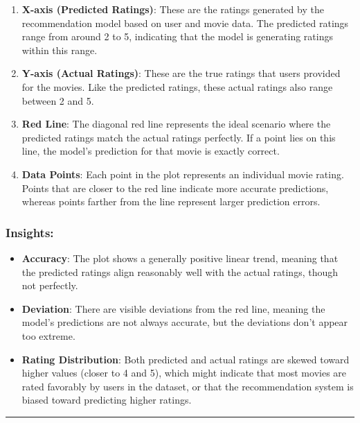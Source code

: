 \documentclass[
]{article}
\begin{document}
\begin{enumerate}
\def\labelenumi{\arabic{enumi}.}
\item
  \textbf{X-axis (Predicted Ratings)}: These are the ratings generated
  by the recommendation model based on user and movie data. The
  predicted ratings range from around 2 to 5, indicating that the model
  is generating ratings within this range.
\item
  \textbf{Y-axis (Actual Ratings)}: These are the true ratings that
  users provided for the movies. Like the predicted ratings, these
  actual ratings also range between 2 and 5.
\item
  \textbf{Red Line}: The diagonal red line represents the ideal scenario
  where the predicted ratings match the actual ratings perfectly. If a
  point lies on this line, the model's prediction for that movie is
  exactly correct.
\item
  \textbf{Data Points}: Each point in the plot represents an individual
  movie rating. Points that are closer to the red line indicate more
  accurate predictions, whereas points farther from the line represent
  larger prediction errors.
\end{enumerate}

\subsubsection{Insights:}\label{insights}

\begin{itemize}
\item
  \textbf{Accuracy}: The plot shows a generally positive linear trend,
  meaning that the predicted ratings align reasonably well with the
  actual ratings, though not perfectly.
\item
  \textbf{Deviation}: There are visible deviations from the red line,
  meaning the model's predictions are not always accurate, but the
  deviations don't appear too extreme.
\item
  \textbf{Rating Distribution}: Both predicted and actual ratings are
  skewed toward higher values (closer to 4 and 5), which might indicate
  that most movies are rated favorably by users in the dataset, or that
  the recommendation system is biased toward predicting higher ratings.
\end{itemize}

\begin{center}\rule{0.5\linewidth}{0.5pt}\end{center}
\end{document}
